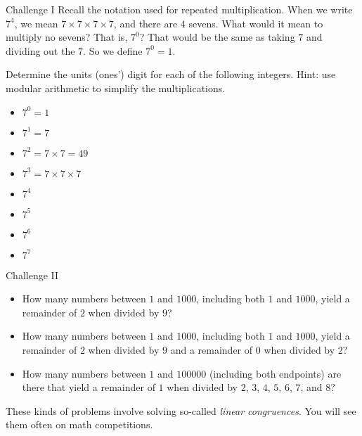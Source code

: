 \documentclass[12pt,letterpaper]{article}
\begin{document}
\begin{problem}{Challenge I}
 Recall the notation used for repeated multiplication. When we write \(7^4\), we
 mean \(7 \times 7 \times 7 \times 7\), and there are \(4\) sevens. What would it
 mean to multiply no sevens? That is, \(7^0\)? That would be the same as taking
 \(7\) and dividing out the \(7\). So we define \(7^0=1\).

 Determine the units (ones') digit for each of the following integers. Hint:
 use modular arithmetic to simplify the multiplications.

 \begin{itemize}
  \item \(7^0 = 1\) \hfill {}
  \item \(7^1 = 7\) \hfill {}
  \item \(7^2 = 7 \times 7 = 49\) \hfill {}
  \item \(7^3 = 7 \times 7 \times 7\) \hfill {}
  \item \(7^4\) \hfill {}
  \item \(7^5\) \hfill {}
  \item \(7^6\) \hfill {}
  \item \(7^7\) \hfill {}
 \end{itemize}
\end{problem}

\begin{problem}{Challenge II}

 \begin{itemize}
  \item How many numbers between \(1\) and \(1000\), including both \(1\) and \(1000\),
  yield a remainder of \(2\) when divided by \(9\)? 
  \item How many numbers between \(1\) and \(1000\), including both \(1\) and \(1000\),
  yield a remainder of \(2\) when divided by \(9\) and a remainder of \(0\) when
  divided by \(2\)? 
  \item How many numbers between \(1\) and \(100000\) (including both endpoints) are
  there that yield a remainder of \(1\) when divided by \(2\), \(3\), \(4\), \(5\), \(6\),
  \(7\), and \(8\)? 
 \end{itemize}

 These kinds of problems involve solving so-called \emph{linear congruences}.
 You will see them often on math competitions.

\end{problem}
\end{document}
